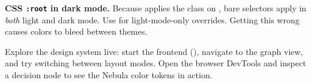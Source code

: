 \begin{warning}
\textbf{CSS \texttt{:root} in dark mode.}  Because 
applies the  class on , bare  selectors
apply in \emph{both} light and dark mode.  Use  for
light-mode-only overrides.  Getting this wrong causes colors to bleed
between themes.
\end{warning}

\begin{tryit}
Explore the design system live: start the frontend (),
navigate to the graph view, and try switching between layout modes.
Open the browser DevTools and inspect a decision node to see the Nebula
color tokens in action.
\end{tryit}
